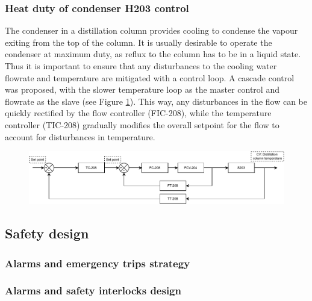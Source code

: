 \subsubsection{Heat duty of condenser H203 control}
The condenser in a distillation column provides cooling to condense the vapour exiting from the top of the column. It is usually desirable to operate the condenser at maximum duty, as reflux to the column has to be in a liquid state. Thus it is important to ensure that any disturbances to the cooling water flowrate and temperature are mitigated with a control loop. A cascade control was proposed, with the slower temperature loop as the master control and flowrate as the slave (see Figure \ref{fig:S203C-TC}). This way, any disturbances in the flow can be quickly rectified by the flow controller (FIC-208), while the temperature controller (TIC-208) gradually modifies the overall setpoint for the flow to account for disturbances in temperature.

\begin{figure}[H]
    \centering
    \includegraphics[width=\linewidth]{chapters/4-operation-control/4-Figures/S203C-TC.pdf}
    \caption{}
    \label{fig:S203C-TC}
\end{figure}


\subsubsection{}

\subsection{Safety design}

\subsubsection{Alarms and emergency trips strategy}

\subsubsection{Alarms and safety interlocks design}
